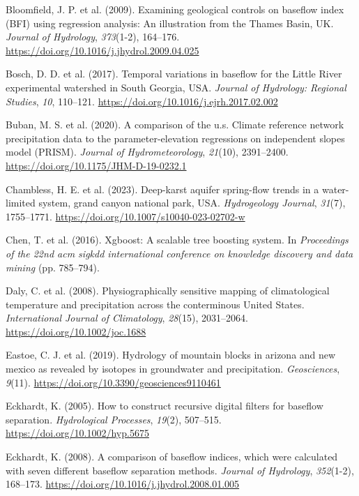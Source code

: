 \documentclass[
]{agujournal2019}
\newlength{\cslhangindent}
\newenvironment{CSLReferences}[2] %
 {\begin{list}{}{%
  \setlength{\itemindent}{0pt}
  \setlength{\leftmargin}{0pt}
  \setlength{\parsep}{0pt}
  \ifodd #1
   \setlength{\leftmargin}{\cslhangindent}
   \setlength{\itemindent}{-1\cslhangindent}
  \fi
  \setlength{\itemsep}{#2\baselineskip}}}
 {\end{list}}
\begin{document}
\begin{CSLReferences}{1}{0}
Bloomfield, J. P. et al. (2009). Examining geological controls on
baseflow index (BFI) using regression analysis: An illustration from the
Thames Basin, UK. \emph{Journal of Hydrology}, \emph{373}(1-2),
164--176. \url{https://doi.org/10.1016/j.jhydrol.2009.04.025}

Bosch, D. D. et al. (2017). Temporal variations in baseflow for the
Little River experimental watershed in South Georgia, USA. \emph{Journal
of Hydrology: Regional Studies}, \emph{10}, 110--121.
\url{https://doi.org/10.1016/j.ejrh.2017.02.002}

Buban, M. S. et al. (2020). A comparison of the u.s. Climate reference
network precipitation data to the parameter-elevation regressions on
independent slopes model (PRISM). \emph{Journal of Hydrometeorology},
\emph{21}(10), 2391--2400. \url{https://doi.org/10.1175/JHM-D-19-0232.1}

Chambless, H. E. et al. (2023). Deep-karst aquifer spring-flow trends in
a water-limited system, grand canyon national park, {USA}.
\emph{Hydrogeology Journal}, \emph{31}(7), 1755--1771.
\url{https://doi.org/10.1007/s10040-023-02702-w}

Chen, T. et al. (2016). Xgboost: A scalable tree boosting system. In
\emph{Proceedings of the 22nd acm sigkdd international conference on
knowledge discovery and data mining} (pp. 785--794).

Daly, C. et al. (2008). Physiographically sensitive mapping of
climatological temperature and precipitation across the conterminous
United States. \emph{International Journal of Climatology},
\emph{28}(15), 2031--2064. \url{https://doi.org/10.1002/joc.1688}

Eastoe, C. J. et al. (2019). Hydrology of mountain blocks in arizona and
new mexico as revealed by isotopes in groundwater and precipitation.
\emph{Geosciences}, \emph{9}(11).
\url{https://doi.org/10.3390/geosciences9110461}

Eckhardt, K. (2005). How to construct recursive digital filters for
baseflow separation. \emph{Hydrological Processes}, \emph{19}(2),
507--515. \url{https://doi.org/10.1002/hyp.5675}

Eckhardt, K. (2008). A comparison of baseflow indices, which were
calculated with seven different baseflow separation methods.
\emph{Journal of Hydrology}, \emph{352}(1-2), 168--173.
\url{https://doi.org/10.1016/j.jhydrol.2008.01.005}


\end{CSLReferences}
\end{document}
